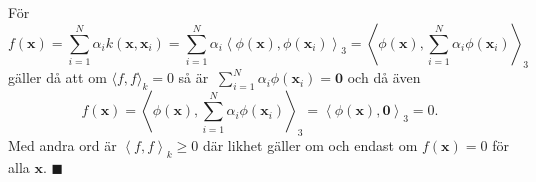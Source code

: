 \documentclass[a4paper, 12pt]{report}
\theoremstyle{definition}
\theoremstyle{remark}
\renewcommand\qedsymbol{$\blacksquare$}
\newcommand{\bfx}{\mathbf{x}}
\begin{document}
\begin{enumerate}
	För
	\begin{equation*}
		f\left(\bfx\right)=\sum_{i=1}^{N}\alpha_i k\left(\bfx, \bfx_i\right) = \sum_{i=1}^{N}\alpha_i \left\langle\phi\left(\bfx\right), \phi\left(\bfx_i\right) \right\rangle_3 = \left\langle \phi\left(\bfx\right), \sum_{i=1}^{N}\alpha_i\phi\left(\bfx_i\right) \right\rangle_3
	\end{equation*}
	gäller då att om $\langle f, f \rangle_k = 0$ så är $\ \sum_{i=1}^{N}\alpha_i\phi\left(\bfx_i\right)=\mathbf{0}$ och då även
	\begin{equation*}
		f\left(\bfx\right) = \left\langle \phi\left(\bfx\right), \sum_{i=1}^{N}\alpha_i\phi\left(\bfx_i\right) \right\rangle_3 = \left\langle \phi\left(\bfx\right), \mathbf{0}\right\rangle_3=0.
	\end{equation*}
	Med andra ord är $\left\langle f, f\right\rangle_k\geq0$ där likhet gäller om och endast om $f\left(\bfx\right)=0$ för alla $\bfx$.
	\qquad \hfill \qedsymbol
	

\end{enumerate}
\end{document}
